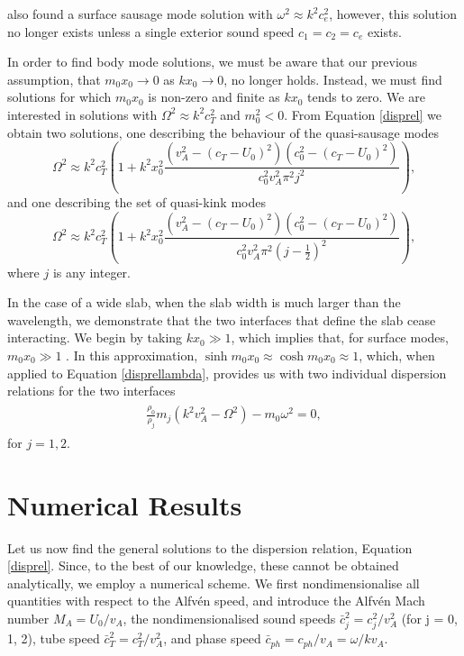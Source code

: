 \cite{Roberts1981b} also found a surface sausage mode solution with $\omega^2 \approx k^2 c_e^2$, however, this solution no longer exists unless a single exterior sound speed $c_1 = c_2 = c_e$ exists.

In order to find body mode solutions, we must be aware that our previous assumption, that $m_0 x_0 \to 0$ as $k x_0 \to 0$, no longer holds. Instead, we must find solutions for which $m_0 x_0$ is non-zero and finite as $k x_0$ tends to zero. We are interested in solutions with $\Omega^2 \approx k^2 c_T^2$ and $m_0^2 < 0$. From Equation \eqref{disprel} we obtain two solutions, one describing the behaviour of the quasi-sausage modes
\begin{equation}
\label{sol3}
\Omega^2 \approx k^2 c_T^2 \left( 1 + k^2 x_0^2 \dfrac{(v_A^2 - (c_T - U_0)^2 )(c_0^2 - (c_T - U_0)^2 ) }{c_0^2 v_A^2 \pi^2 j^2} \right),
\end{equation}
and one describing the set of quasi-kink modes
\begin{equation}
\label{sol4}
\Omega^2 \approx k^2 c_T^2 \left( 1 + k^2 x_0^2 \dfrac{(v_A^2 - (c_T - U_0)^2 )(c_0^2 - (c_T - U_0)^2 ) }{c_0^2 v_A^2 \pi^2 (j- \frac{1}{2})^2} \right),
\end{equation}
where $j$ is any integer.

In the case of a wide slab, when the slab width is much larger than the wavelength, we demonstrate that the two interfaces that define the slab cease interacting. We begin by taking $k x_0 \gg 1$, which implies that, for surface modes, $m_0 x_0 \gg 1$ \citep{Roberts1981b}. In this approximation, $\sinh m_0 x_0 \approx \cosh m_0 x_0 \approx 1$, which, when applied to Equation \eqref{disprellambda}, provides us with two individual dispersion relations for the two interfaces
\begin{align}
\begin{split}
\label{disprelwide}
\frac{\rho_0}{\rho_j} m_j \left( k^2 v_A^2 - \Omega^2 \right) - m_0 \omega^2 = 0,
\end{split}
\end{align}
for $j=1,2$.

\section{Numerical Results}

Let us now find the general solutions to the dispersion relation, Equation \eqref{disprel}. Since, to the best of our knowledge, these cannot be obtained analytically, we employ a numerical scheme. We first nondimensionalise all quantities with respect to the Alfv\'en speed, and introduce the Alfv\'en Mach number $M_A = U_0/v_A$, the nondimensionalised sound speeds $\bar c_j^2 = c_j^2 / v_A^2$ (for j = 0, 1, 2), tube speed $\bar c_T^2 = c_T^2 / v_A^2$, and phase speed $\bar c_{ph} = c_{ph} / v_A = \omega / k v_A$.

